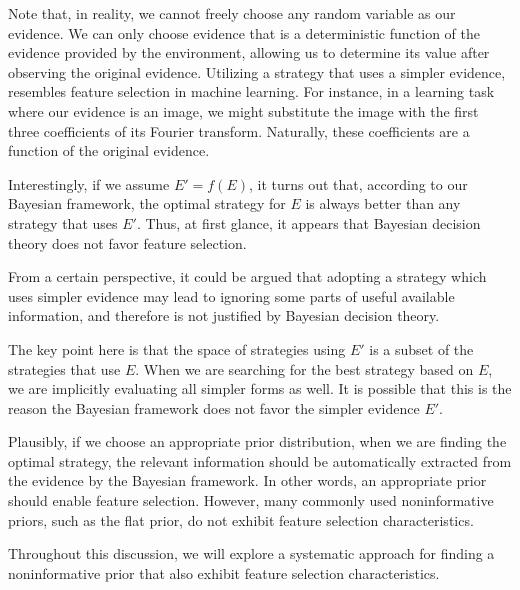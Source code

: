 Note that, in reality, we cannot freely choose any random variable as our evidence.
We can only choose evidence that is a deterministic function of the evidence provided by the environment,
allowing us to determine its value after observing the original evidence.
Utilizing a strategy that uses a simpler evidence, resembles feature selection in machine learning.
For instance, in a learning task where our evidence is an image, we might substitute the image with the first
three coefficients of its Fourier transform.
Naturally, these coefficients are a function of the original evidence.

Interestingly, if we assume $E' = f(E)$, it turns out
that, according to our Bayesian framework, the optimal strategy for $E$ is always
better than any strategy that uses $E'$.
Thus, at first glance, it appears that Bayesian decision theory does not favor feature selection.

From a certain perspective, it could be argued that adopting a strategy which uses simpler evidence may lead to
ignoring some parts of useful available information, and therefore is not justified by Bayesian
decision theory.

The key point here is that the space of strategies using $E'$ is a subset of the strategies that use $E$.
When we are searching for the best strategy based on $E$, we are implicitly evaluating all simpler forms as well.
It is possible that this is the reason the Bayesian framework does not favor the simpler evidence $E'$.

Plausibly, if we choose an appropriate prior distribution, when we are finding the optimal
strategy, the relevant information should be automatically extracted from the evidence by the Bayesian framework.
In other words, an appropriate prior should enable feature selection.
However, many commonly used noninformative priors, such as the flat prior, do not exhibit feature
selection characteristics.

Throughout this discussion, we will explore a systematic approach for finding a noninformative prior that also
exhibit feature selection characteristics.


